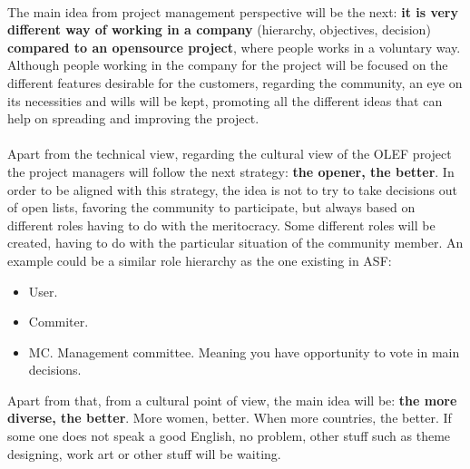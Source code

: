 \documentclass[11pt]{article}
\begin{document}
\\ 
The main idea from project management perspective will be the next: \textbf{it is very different way of working in a company} (hierarchy, objectives, decision) \textbf{compared to an opensource project}, where people works in a voluntary way. Although people working in the company for the project will be focused  on the different features desirable for the customers, regarding the community, an eye on its necessities and wills will be kept, promoting all the different ideas that can help on spreading and improving the project.\\
\\
Apart from the technical view, regarding the cultural view of the OLEF project the project managers will follow the next strategy: \textbf{the opener, the better}.  In order to be aligned with this strategy, the idea is not to try to take decisions out of open lists, favoring the community to  participate, but always based on different roles having to do with the meritocracy. Some different roles will be created, having to do with the particular situation of the community member. An example could be a similar role hierarchy as the one existing in ASF:
\begin{itemize}\itemsep0pt
\item{User}.
\item{Commiter}.
\item{MC}. Management committee. Meaning you have opportunity to vote in main decisions.
\end{itemize}
Apart from that, from a cultural point of view, the main idea will be: \textbf{the more diverse, the better}. More women, better. When more countries, the better. If some one does not speak a good English, no problem, other stuff such as theme designing, work art or other stuff will be waiting.
\end{document}
